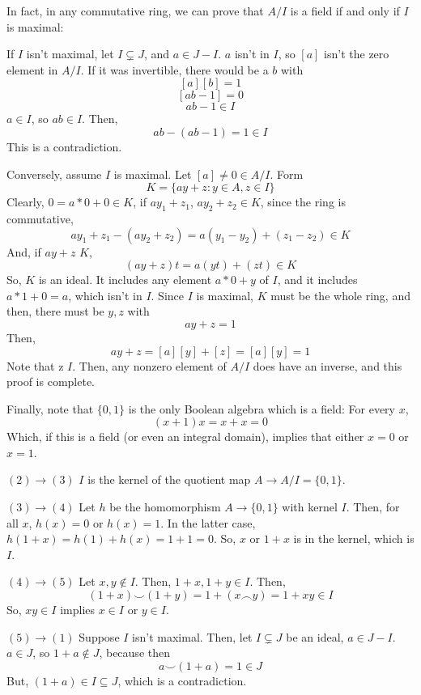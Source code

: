 \documentclass{article}
\begin{document}
      In fact, in any commutative ring, we can prove that $A/I$ is a field if
      and only if $I$ is maximal:

      If $I$ isn't maximal, let $I \subsetneq J$, and $a \in J - I$. $a$ isn't
      in $I$, so $[a]$ isn't the zero element in $A/I$. If it was invertible,
      there would be a $b$ with
      \[[a][b] = 1\]
      \[[ab - 1] = 0\]
      \[ab - 1 \in I\]
      $a \in I$, so $ab \in I$. Then,
      \[ab - (ab - 1) = 1 \in I\]
      This is a contradiction.

      Conversely, assume $I$ is maximal. Let $[a] \neq 0 \in A/I$. Form
      \[K = \{ay + z: y \in A, z \in I\} \]
      Clearly, $0 = a*0 + 0 \in K$, if $ay_1 + z_1$, $ay_2 + z_2 \in K$, since
      the ring is commutative,
      \[ay_1 + z_1 -(ay_2 + z_2) = a(y_1-y_2) + (z_1 - z_2) \in K\]
      And, if $ay + z$ \in $K$,
      \[(ay + z)t = a(yt) + (zt) \in K\]
      So, $K$ is an ideal. It includes any element $a*0 + y$ of $I$, and it
      includes $a*1 + 0 = a$, which isn't in $I$. Since $I$ is maximal, $K$ must
      be the whole ring, and then, there must be $y, z$ with
      \[ay + z = 1\]
      Then,
      \[ay + z= [a][y] + [z] = [a][y] = 1\]
      Note that z \in $I$. Then, any nonzero element of $A/I$ does have an
      inverse, and this proof is complete.

      Finally, note that $\{0,1\}$ is the only Boolean algebra which is a field:
      For every $x$,
      \[(x+1)x = x + x = 0\]
      Which, if this is a field (or even an integral domain), implies that
      either $x=0$ or $x=1$.

      $(2) \rightarrow (3)$ $I$ is the kernel of the quotient map $A \rightarrow
      A/I = \{0,1\}$.

      $(3) \rightarrow (4)$ Let $h$ be the homomorphism $A \rightarrow \{0,1\}$
      with kernel $I$. Then, for all $x$, $h(x) = 0$ or $h(x) = 1$. In the
      latter case, $h(1+x) = h(1) + h(x) = 1 + 1 = 0$. So, $x$ or $1+x$ is in
      the kernel, which is $I$.

      $(4) \rightarrow (5)$ Let $x, y \notin I$. Then, $1+x, 1+y \in I$. Then,
      \[(1+x) \smile (1+y) = 1 + (x \frown y) = 1 + xy \in I\]
      So, $xy \in I$ implies $x \in I$ or $y \in I$.

      $(5) \rightarrow (1)$ Suppose $I$ isn't maximal. Then, let $I \subsetneq
      J$ be an ideal, $a \in J - I$. $a \in J$, so $1+a \notin J$, because then
      \[a \smile (1+a) = 1 \in J\]
      But, $(1+a) \in I \subseteq J$, which is a contradiction.
\end{document}
